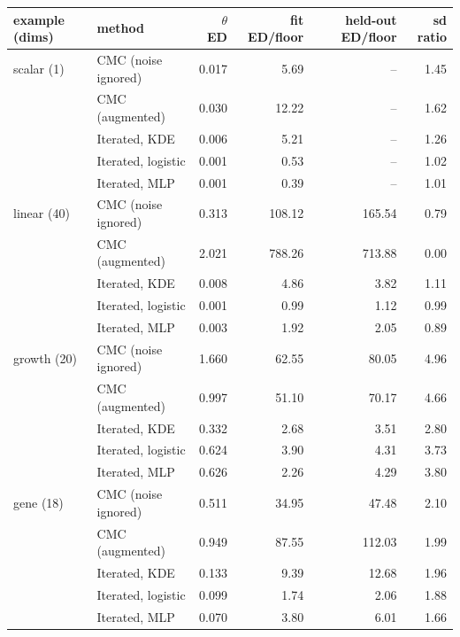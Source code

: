 \begin{tabular}{llrrrr}
\toprule
example (dims) & method & $\theta$ ED & fit ED/floor & held-out ED/floor & sd ratio \\
\midrule
scalar (1) & CMC (noise ignored) & 0.017 & 5.69 & -- & 1.45 \\
 & CMC (augmented) & 0.030 & 12.22 & -- & 1.62 \\
 & Iterated, KDE & 0.006 & 5.21 & -- & 1.26 \\
 & Iterated, logistic & 0.001 & 0.53 & -- & 1.02 \\
 & Iterated, MLP & 0.001 & 0.39 & -- & 1.01 \\ \addlinespace
linear (40) & CMC (noise ignored) & 0.313 & 108.12 & 165.54 & 0.79 \\
 & CMC (augmented) & 2.021 & 788.26 & 713.88 & 0.00 \\
 & Iterated, KDE & 0.008 & 4.86 & 3.82 & 1.11 \\
 & Iterated, logistic & 0.001 & 0.99 & 1.12 & 0.99 \\
 & Iterated, MLP & 0.003 & 1.92 & 2.05 & 0.89 \\ \addlinespace
growth (20) & CMC (noise ignored) & 1.660 & 62.55 & 80.05 & 4.96 \\
 & CMC (augmented) & 0.997 & 51.10 & 70.17 & 4.66 \\
 & Iterated, KDE & 0.332 & 2.68 & 3.51 & 2.80 \\
 & Iterated, logistic & 0.624 & 3.90 & 4.31 & 3.73 \\
 & Iterated, MLP & 0.626 & 2.26 & 4.29 & 3.80 \\ \addlinespace
gene (18) & CMC (noise ignored) & 0.511 & 34.95 & 47.48 & 2.10 \\
 & CMC (augmented) & 0.949 & 87.55 & 112.03 & 1.99 \\
 & Iterated, KDE & 0.133 & 9.39 & 12.68 & 1.96 \\
 & Iterated, logistic & 0.099 & 1.74 & 2.06 & 1.88 \\
 & Iterated, MLP & 0.070 & 3.80 & 6.01 & 1.66 \\
\bottomrule
\end{tabular}
